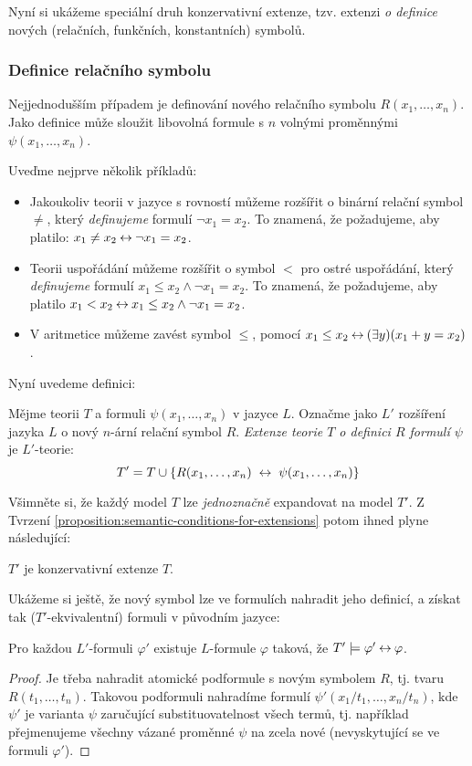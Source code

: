 Nyní si ukážeme speciální druh konzervativní extenze, tzv. extenzi \emph{o definice} nových (relačních, funkčních, konstantních) symbolů.


\subsubsection*{Definice relačního symbolu}

Nejjednodušším případem je definování nového relačního symbolu $R(x_1,\dots,x_n)$. Jako definice může sloužit libovolná formule s $n$ volnými proměnnými $\psi(x_1,\dots,x_n)$.

\begin{example}
Uveďme nejprve několik příkladů:
\begin{itemize}
    \item Jakoukoliv teorii v jazyce s rovností můžeme rozšířit o binární relační symbol $\neq$, který \emph{definujeme} formulí $\neg x_1=x_2$. To znamená, že požadujeme, aby platilo: $x_1\neq x_2\mathbin{\leftrightarrow}\neg x_1=x_2$.
    \item Teorii uspořádání můžeme rozšířit o symbol $<$ pro ostré uspořádání, který \emph{definujeme} formulí $x_1\leq x_2\land \neg x_1=x_2$. To znamená, že požadujeme, aby platilo $x_1<x_2 \mathbin{\leftrightarrow} x_1\leq x_2\land \neg x_1=x_2$.
    \item V aritmetice můžeme zavést symbol $\leq$, pomocí $x_1\leq x_2\mathbin{\leftrightarrow}(\exists y)(x_1+y=x_2)$.
\end{itemize}
\end{example}
Nyní uvedeme definici:
\begin{definition}
    Mějme teorii $T$ a formuli $\psi(x_1,\dots,x_n)$ v jazyce $L$. Označme jako $L'$ rozšíření jazyka $L$ o nový $n$-ární relační symbol $R$. \emph{Extenze teorie $T$ o definici $R$ formulí $\psi$} je $L'$-teorie:
    $$
    T'=T\cup\{R(x_1,\dots,x_n)\ \liff\ \psi(x_1,\dots,x_n)\}
    $$
\end{definition}
Všimněte si, že každý model $T$ lze \emph{jednoznačně} expandovat na model $T'$. Z Tvrzení \ref{proposition:semantic-conditions-for-extensions} potom ihned plyne následující:
\begin{corollary}
    $T'$ je konzervativní extenze $T$.
\end{corollary}

Ukážeme si ještě, že nový symbol lze ve formulích nahradit jeho definicí, a získat tak ($T'$-ekvivalentní) formuli v původním jazyce:

\begin{proposition}
    Pro každou $L'$-formuli $\varphi'$ existuje $L$-formule $\varphi$ taková, že $T'\models\varphi'\mathbin{\leftrightarrow}\varphi$.
\end{proposition}
\begin{proof}
    Je třeba nahradit atomické podformule s novým symbolem $R$, tj. tvaru $R(t_1,\dots,t_n)$. Takovou podformuli nahradíme formulí $\psi'(x_1/t_1,\dots,x_n/t_n)$, kde $\psi'$ je varianta $\psi$ zaručující substituovatelnost všech termů, tj. například přejmenujeme všechny vázané proměnné $\psi$ na zcela nové (nevyskytující se ve formuli $\varphi'$).
\end{proof}

